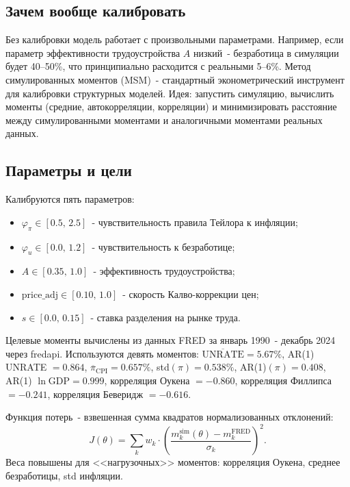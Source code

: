 \documentclass[12pt, a4paper]{article}
\begin{document}
\subsection{Зачем вообще калибровать}

Без калибровки модель работает с произвольными параметрами. Например, если параметр эффективности трудоустройства $A$ низкий~- безработица в симуляции будет 40--50\%, что принципиально расходится с реальными 5--6\%. Метод симулированных моментов (MSM)~- стандартный эконометрический инструмент для калибровки структурных моделей. Идея: запустить симуляцию, вычислить моменты (средние, автокорреляции, корреляции) и минимизировать расстояние между симулированными моментами и аналогичными моментами реальных данных.

\subsection{Параметры и цели}

Калибруются пять параметров:
\begin{itemize}
  \item $\varphi_{\pi} \in [0.5,\, 2.5]$~- чувствительность правила Тейлора к инфляции;
  \item $\varphi_u \in [0.0,\, 1.2]$~- чувствительность к безработице;
  \item $A \in [0.35,\, 1.0]$~- эффективность трудоустройства;
  \item $\text{price\_adj} \in [0.10,\, 1.0]$~- скорость Калво-коррекции цен;
  \item $s \in [0.0,\, 0.15]$~- ставка разделения на рынке труда.
\end{itemize}

Целевые моменты вычислены из данных FRED за январь 1990~- декабрь 2024 через fredapi. Используются девять моментов: $\overline{\text{UNRATE}} = 5.67\%$, AR(1) UNRATE $= 0.864$, $\overline{\pi}_{\text{CPI}} = 0.657\%$, std$(\pi) = 0.538\%$, AR(1)$(\pi) = 0.408$, AR(1) $\ln\text{GDP} = 0.999$, корреляция Оукена $= -0.860$, корреляция Филлипса $= -0.241$, корреляция Беверидж $= -0.616$.

Функция потерь~- взвешенная сумма квадратов нормализованных отклонений:
\begin{equation}
J(\theta) = \sum_k w_k \cdot \left(\frac{m^{\text{sim}}_k(\theta) - m^{\text{FRED}}_k}{\sigma_k}\right)^2.
\end{equation}
Веса повышены для <<нагрузочных>> моментов: корреляция Оукена, среднее безработицы, std инфляции.
\end{document}

